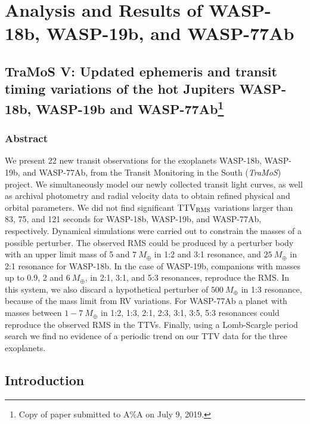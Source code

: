 \chapter{Analysis and Results of WASP-18b, WASP-19b, and WASP-77Ab}\label{chap:paper}

\section*{TraMoS V: Updated ephemeris and transit timing variations of the hot Jupiters WASP-18b, WASP-19b and WASP-77Ab\footnote{Copy of paper submitted to A\%A on July 9, 2019.}}


\subsection*{Abstract}

We present 22 new transit observations for the exoplanets WASP-18b, WASP-19b, and WASP-77Ab, from the Transit Monitoring in the South (\emph{TraMoS}) project. We simultaneously model our newly collected transit light curves, as well as archival photometry and radial velocity data to obtain refined physical and orbital parameters. We did not find significant $\rm TTV_{RMS}$ variations larger than 83, 75, and 121 seconds for WASP-18b, WASP-19b, and WASP-77Ab, respectively. Dynamical simulations were carried out to constrain the masses of a possible perturber. The observed RMS could be produced by a perturber body with an upper limit mass of 5 and $7~M_{\oplus}$ in 1:2 and 3:1 resonance, and $25~M_{\oplus}$ in 2:1 resonance for WASP-18b. In the case of WASP-19b, companions with masses up to 0.9, 2 and $6~M_{\oplus}$, in 2:1, 3:1, and 5:3 resonances, reproduce the RMS. In this system, we also discard a hypothetical perturber of $500~M_{\oplus}$ in 1:3 resonance, because of the mass limit from RV variations. For WASP-77Ab a planet with masses between $1-7~M_{\oplus}$ in 1:2, 1:3, 2:1, 2:3, 3:1, 3:5, 5:3 resonances could reproduce the observed RMS in the TTVs. Finally, using a Lomb-Scargle period search we find no evidence of a periodic trend on our TTV data for the three exoplanets.

\section{Introduction}

